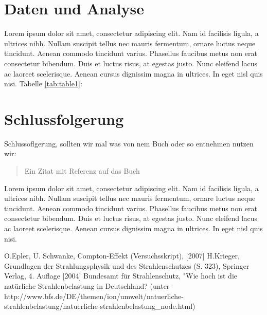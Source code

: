 \documentclass[aps,twocolumn,secnumarabic,nobalancelastpage,amsmath,amssymb,
nofootinbib,superscriptaddress]{revtex4-1}
\begin{document}
\section{Daten und Analyse}

Lorem ipsum dolor sit amet, consectetur adipiscing elit. Nam id facilisis ligula,
a ultrices nibh. Nullam suscipit tellus nec mauris fermentum, ornare luctus neque
tincidunt. Aenean commodo tincidunt varius. Phasellus faucibus metus non erat
consectetur bibendum. Duis et luctus risus, at egestas justo. Nunc eleifend lacus
ac laoreet scelerisque. Aenean cursus dignissim magna in ultrices. In eget nisl
quis nisi. Tabelle \ref{tab:table1}:







\section{Schlussfolgerung}

Schlussoflgerung, sollten wir mal was von nem Buch oder so entnehmen nutzen wir:


\begin{quote}
  Ein Zitat mit Referenz auf das Buch\cite{melissinos1966}
\end{quote}

Lorem ipsum dolor sit amet, consectetur adipiscing elit. Nam id facilisis ligula,
a ultrices nibh. Nullam suscipit tellus nec mauris fermentum, ornare luctus neque
tincidunt. Aenean commodo tincidunt varius. Phasellus faucibus metus non erat
consectetur bibendum. Duis et luctus risus, at egestas justo. Nunc eleifend lacus
ac laoreet scelerisque. Aenean cursus dignissim magna in ultrices. In eget nisl
quis nisi.




\begin{thebibliography}{99}
O.Epler, U. Schwanke, Compton-Effekt (Versuchsskript),  [2007]
H.Krieger, Grundlagen der Strahlungsphysik und des Strahlenschutzes (S. 323), Springer Verlag, 4. Auflage [2004]
Bundesamt für Strahlenschutz, "Wie hoch ist die natürliche Strahlenbelastung in Deutschland?\grqq\: (unter http://www.bfs.de/DE/themen/ion/umwelt/natuerliche-strahlenbelastung/natuerliche-strahlenbelastung_node.html)
\end{thebibliography}
\end{document}
